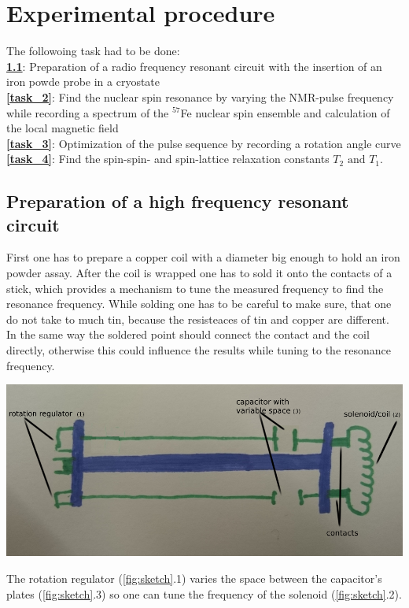 \section{Experimental procedure}

    The followoing task had to be done:\\
    \textbf{\ref{task_1}}: Preparation of a radio frequency resonant circuit with the insertion of an iron powde probe in a cryostate\\
    \textbf{\ref{task_2}}: Find the nuclear spin resonance by varying the NMR-pulse frequency while recording a spectrum of the $^{57}$Fe nuclear spin ensemble and calculation of the local magnetic field\\
    \textbf{\ref{task_3}}: Optimization of the pulse sequence by recording a rotation angle curve\\
    \textbf{\ref{task_4}}: Find the spin-spin- and spin-lattice relaxation constants $T_2 \text{ and } T_1$.   

	\subsection{Preparation of a high frequency resonant circuit}
    \label{task_1}
    First one has to prepare a copper coil with a diameter big enough to hold an iron powder assay. After the coil is wrapped one has to sold it onto the contacts of a stick, which provides a mechanism to tune the measured frequency to find the resonance frequency. While solding one has to be careful to make sure, that one do not take to much tin, because the resisteaces of tin and copper are different. In the same way the soldered point should connect the contact and the coil directly, otherwise this could influence the results while tuning to the resonance frequency.
    \begin{center}
           \includegraphics[scale=0.4]{pic/Skizze_Sonde.png} 
           \label{fig:sketch}
    \end{center}
    The rotation regulator (\ref{fig:sketch}.1) varies the space between the capacitor's plates (\ref{fig:sketch}.3) so one can tune the frequency of the solenoid (\ref{fig:sketch}.2).
